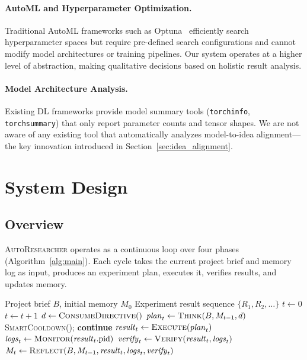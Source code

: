 \documentclass[11pt,a4paper]{article}
\newcommand{\sysname}{\textsc{AutoResearcher}}
\newcommand{\toolname}[1]{\texttt{#1}}
\begin{document}
\paragraph{AutoML and Hyperparameter Optimization.}
Traditional AutoML frameworks such as Optuna~\cite{akiba2019optuna} efficiently search hyperparameter spaces but require pre-defined search configurations and cannot modify model architectures or training pipelines.
Our system operates at a higher level of abstraction, making qualitative decisions based on holistic result analysis.

\paragraph{Model Architecture Analysis.}
Existing DL frameworks provide model summary tools (\toolname{torchinfo}, \toolname{torchsummary}) that only report parameter counts and tensor shapes.
We are not aware of any existing tool that automatically analyzes model-to-idea alignment---the key innovation introduced in Section~\ref{sec:idea_alignment}.


\section{System Design}

\subsection{Overview}

\sysname{} operates as a continuous loop over four phases (Algorithm~\ref{alg:main}).
Each cycle takes the current project brief and memory log as input, produces an experiment plan, executes it, verifies results, and updates memory.

\begin{algorithm}[t]
\caption{\sysname{} Main Loop}\label{alg:main}
\begin{algorithmic}[1]
\Require Project brief $B$, initial memory $M_0$
\Ensure Experiment result sequence $\{R_1, R_2, \ldots\}$
\State $t \gets 0$
    \State $t \gets t + 1$
    \State $d \gets \textsc{ConsumeDirective}()$ 
    \State $\mathit{plan}_t \gets \textsc{Think}(B, M_{t-1}, d)$ 
        \State \textsc{SmartCooldown}(); \textbf{continue}
    \EndIf
    \State $\mathit{result}_t \gets \textsc{Execute}(\mathit{plan}_t)$ 
        \State $\mathit{logs}_t \gets \textsc{Monitor}(\mathit{result}_t.\text{pid})$ 
    \EndIf
    \State $\mathit{verify}_t \gets \textsc{Verify}(\mathit{result}_t, \mathit{logs}_t)$ 
    \State $M_t \gets \textsc{Reflect}(B, M_{t-1}, \mathit{result}_t, \mathit{logs}_t, \mathit{verify}_t)$
\EndWhile
\end{algorithmic}
\end{algorithm}
\end{document}
